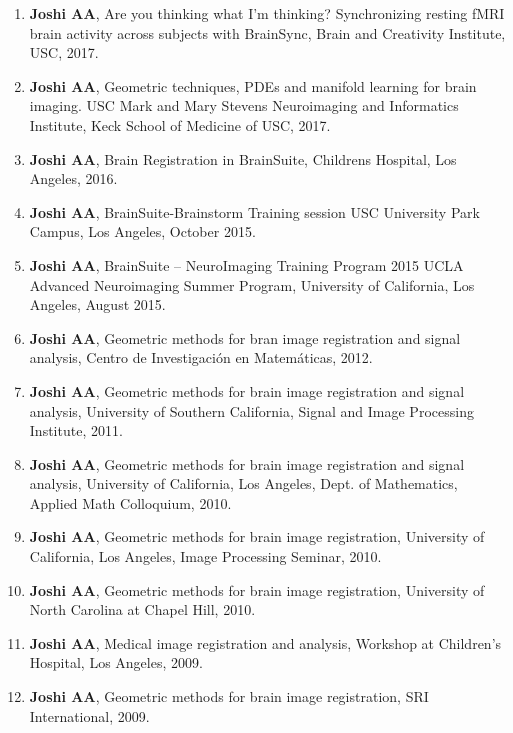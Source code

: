 \documentclass[overlapped,line,letterpaper]{res}
\begin{document}
\begin{resume}
\begin{enumerate}
    \item \textbf{Joshi AA}, Are you thinking what I'm thinking? Synchronizing resting fMRI brain activity across subjects with BrainSync, Brain and Creativity Institute, USC, 2017.

    \item \textbf{Joshi AA}, Geometric techniques, PDEs and manifold learning for brain imaging. USC Mark and Mary Stevens
Neuroimaging and Informatics Institute, Keck School of Medicine of USC, 2017.

    \item \textbf{Joshi AA}, Brain Registration in BrainSuite, Childrens Hospital, Los Angeles, 2016.

    \item \textbf{Joshi AA}, BrainSuite-Brainstorm Training session USC University Park Campus, Los Angeles, October 2015.

    \item \textbf{Joshi AA}, BrainSuite – NeuroImaging Training Program 2015 UCLA Advanced Neuroimaging Summer Program, University of California, Los Angeles, August 2015.  

    \item \textbf{Joshi AA}, Geometric methods for bran image registration and signal analysis, Centro de Investigación en Matemáticas, 2012.

    \item \textbf{Joshi AA}, Geometric methods for brain image registration and signal analysis, University of Southern California, Signal and Image Processing Institute, 2011.

    \item \textbf{Joshi AA}, Geometric methods for brain image registration and signal analysis, University of California, Los Angeles, Dept. of Mathematics, Applied Math Colloquium, 2010.

    \item \textbf{Joshi AA}, Geometric methods for brain image registration, University of California, Los Angeles, Image Processing Seminar, 2010. 

    \item \textbf{Joshi AA}, Geometric methods for brain image registration, University of North Carolina at Chapel Hill, 2010. 

    \item \textbf{Joshi AA}, Medical image registration and analysis, Workshop at Children's Hospital, Los Angeles, 2009.

    \item \textbf{Joshi AA}, Geometric methods for brain image registration, SRI International, 2009. 


\end{enumerate}
\end{resume}
\end{document}
